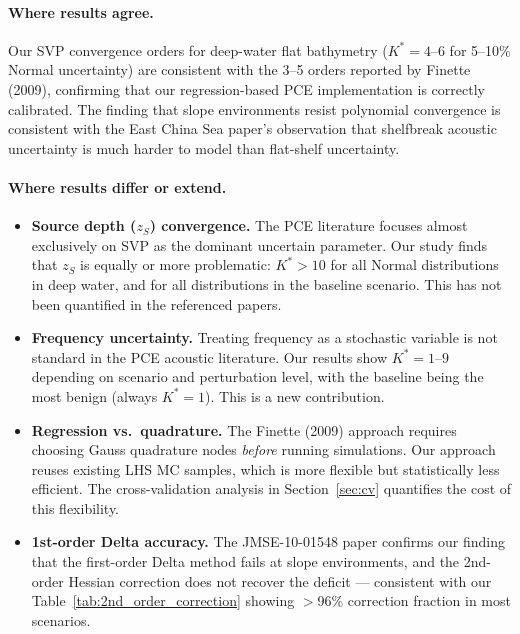 \documentclass[11pt,a4paper]{article}
\begin{document}
\paragraph{Where results agree.}
Our SVP convergence orders for deep-water flat bathymetry ($K^* = 4$--$6$ for 5--10\%
Normal uncertainty) are consistent with the 3--5 orders reported by Finette (2009),
confirming that our regression-based PCE implementation is correctly calibrated.
The finding that slope environments resist polynomial convergence is consistent with
the East China Sea paper's observation that shelfbreak acoustic uncertainty is much
harder to model than flat-shelf uncertainty.

\paragraph{Where results differ or extend.}
\begin{itemize}
  \item \textbf{Source depth ($z_S$) convergence.} The PCE literature focuses almost
        exclusively on SVP as the dominant uncertain parameter.  Our study finds that
        $z_S$ is equally or more problematic: $K^* > 10$ for all Normal distributions
        in deep water, and for all distributions in the baseline scenario.
        This has not been quantified in the referenced papers.
  \item \textbf{Frequency uncertainty.} Treating frequency as a stochastic variable
        is not standard in the PCE acoustic literature.  Our results show $K^* = 1$--$9$
        depending on scenario and perturbation level, with the baseline being the
        most benign (always $K^* = 1$).  This is a new contribution.
  \item \textbf{Regression vs.\ quadrature.} The Finette (2009) approach requires
        choosing Gauss quadrature nodes \emph{before} running simulations.  Our
        approach reuses existing LHS MC samples, which is more flexible but
        statistically less efficient.  The cross-validation analysis in
        Section~\ref{sec:cv} quantifies the cost of this flexibility.
  \item \textbf{1st-order Delta accuracy.}  The JMSE-10-01548 paper confirms our
        finding that the first-order Delta method fails at slope environments, and
        the 2nd-order Hessian correction does not recover the deficit — consistent
        with our Table~\ref{tab:2nd_order_correction} showing $>$96\% correction
        fraction in most scenarios.
\end{itemize}
\end{document}
